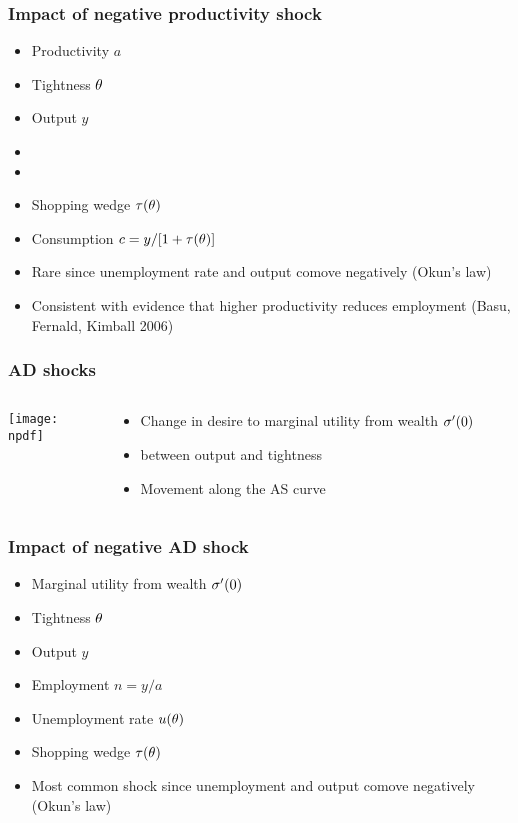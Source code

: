 \documentclass[11pt,aspectratio=169,xcolor={dvipsnames},hyperref={pdftex,pdfpagemode=UseNone,hidelinks,pdfdisplaydoctitle=true},usepdftitle=false]{beamer}
\newcommand{\npdf}{../figures/figures3.pdf}
\begin{document}
\begin{frame}
\frametitle{Impact of negative productivity shock}
\begin{itemize}
\item Productivity $a$ \down
\item Tightness $\theta$ \up
\item Output $y$ \down
\item {}
\item {}
\item Shopping wedge $\tau(\theta)$ \up
\item Consumption $c = y/[1+\tau(\theta)]$ \down
\item Rare since unemployment rate and output comove negatively (Okun's law)
\item Consistent with evidence that higher productivity reduces employment (Basu, Fernald, Kimball 2006)
\end{itemize}	
\end{frame}

\begin{frame}
\frametitle{AD shocks}
\begin{columns}
\begin{column}{0.6\textwidth}
\texttt{[image: \\npdf]}%
\end{column}
\begin{column}{0.4\textwidth}
\begin{itemize}
	\item Change in desire to marginal utility from wealth $\sigma'(0)$
	\item {} between output and tightness
	\item Movement along the AS curve
\end{itemize}
\end{column}
\end{columns} 
\end{frame}


\begin{frame}
\frametitle{Impact of negative AD shock}
\begin{itemize}
\item Marginal utility from wealth $\sigma'(0)$ \down
\item Tightness $\theta$ \down
\item Output $y$ \down
\item Employment $n = y/a$ \down
\item Unemployment rate $u(\theta)$ \up
\item Shopping wedge $\tau(\theta)$ \down
\item Most common shock since unemployment and output comove negatively (Okun's law)
\end{itemize}	
\end{frame}
\end{document}
